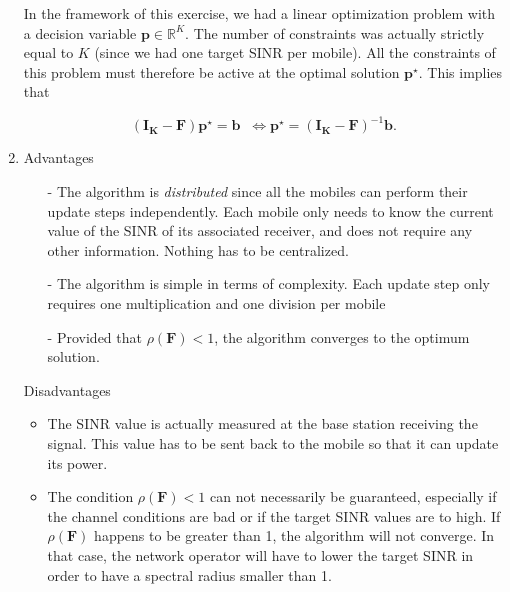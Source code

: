\documentclass [a4paper, 11pt] {article}
\begin{document}
\begin{solution}
\begin{enumerate}
    In the framework of this exercise, we had a linear optimization problem with a decision variable $\mathbf{p} \in \mathbb{R}^K$. The number of constraints was actually strictly equal to $K$ (since we had one target SINR per mobile). All the constraints of this problem must therefore be active at the optimal solution $\mathbf{p}^\star$. This implies that 
    
    \begin{equation}(\mathbf{I_K} - \mathbf{F})\mathbf{p}^\star = \mathbf{b} \; \; \Leftrightarrow \mathbf{p}^\star = (\mathbf{I_K} - \mathbf{F})^{-1} \mathbf{b}.
    \end{equation}
    
    

    \item Advantages 
    
    \begin{itemize}
        \item[-] The algorithm is \textit{distributed} since all the mobiles can perform their update steps independently. Each mobile only needs to know the current value of the SINR of its associated receiver, and does not require any other information. Nothing has to be centralized. 
        \item[-] The algorithm is simple in terms of complexity. Each update step only requires one multiplication and one division per mobile
        \item[-] Provided that $\rho(\mathbf{F})<1$, the algorithm converges to the optimum solution.
    \end{itemize}
    Disadvantages
    \begin{itemize}
        \item The SINR value is actually measured at the base station receiving the signal. This value has to be sent back to the mobile so that it can update its power. 
        \item The condition $\rho(\mathbf{F})<1$ can not necessarily be guaranteed, especially if the channel conditions are bad or if the target SINR values are to high. If $\rho(\mathbf{F})$ happens to be greater than 1, the algorithm will not converge. In that case, the network operator will have to lower the target SINR in order to have a spectral radius smaller than 1.
    \end{itemize}
\end{enumerate}
    \end{solution}
   
\end{document}
